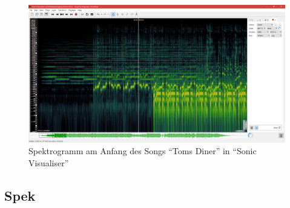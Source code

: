 \documentclass[a4paper]{article}
\begin{document}
\begin{figure}[H]
    \centering
    \begin{minipage}{1.0\textwidth}
        \centering
        \includegraphics[width=1.0\textwidth]{Sonic_Toms_Diner_Spectrogram_close.png}
        \caption{Spektrogramm am Anfang des Songs "`Toms Diner"' in "`Sonic Visualiser"'}
    \end{minipage}
\end{figure}
\newpage
\subsection{Spek}\label{subsec:spek}
\end{document}
